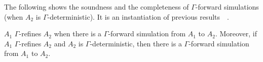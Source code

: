 The following shows the soundness and the completeness of $\Gamma$-forward simulations (when $A_2$ is $\Gamma$-deterministic). It is an instantiation of previous results~~\cite{DBLP:journals/tcs/AbadiL91,DBLP:journals/iandc/LynchV95}.

\vspace{-1.5mm}
\begin{theorem}\label{th:forSim}
$A_1$ $\Gamma$-refines $A_2$ when there is a $\Gamma$-forward simulation from $A_1$ to $A_2$. Moreover, if $A_1$ $\Gamma$-refines $A_2$ and $A_2$ is $\Gamma$-deterministic, then there is a $\Gamma$-forward simulation from $A_1$ to $A_2$.
\vspace{-1.5mm}
\end{theorem}

